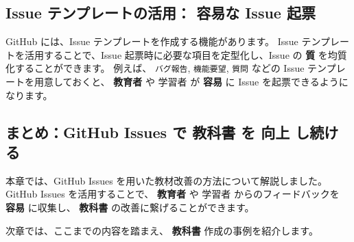 \subsection{Issue テンプレートの活用： \textbf{容易な} Issue 起票}

GitHub には、Issue テンプレートを作成する機能があります。
Issue テンプレートを活用することで、Issue 起票時に必要な項目を定型化し、Issue の \textbf{質} を均質化することができます。
例えば、 \texttt{バグ報告}, \texttt{機能要望}, \texttt{質問} などの Issue テンプレートを用意しておくと、 \textbf{教育者} や 学習者 が \textbf{容易} に Issue を起票できるようになります。

\subsection{まとめ：GitHub Issues で \textbf{教科書} を \textbf{向上} し続ける}

本章では、GitHub Issues を用いた教材改善の方法について解説しました。
GitHub Issues を活用することで、 \textbf{教育者} や 学習者 からのフィードバックを \textbf{容易} に収集し、 \textbf{教科書} の改善に繋げることができます。

次章では、ここまでの内容を踏まえ、 \textbf{教科書} 作成の事例を紹介します。
